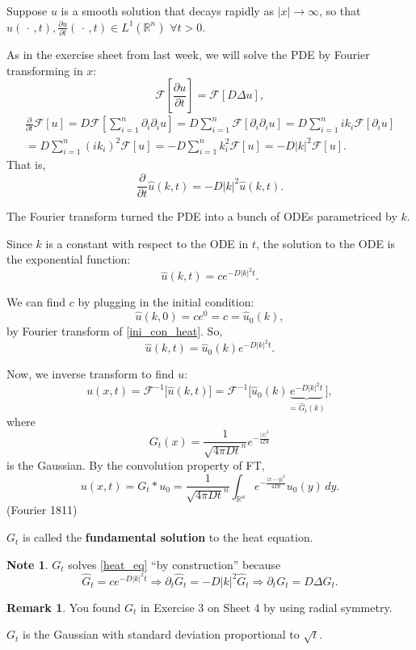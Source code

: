 \documentclass[12pt]{article}
\theoremstyle{definition}
\newtheorem*{remark}{Remark}
\newtheorem*{note}{Note}
\begin{document}
Suppose $u$ is a smooth solution that decays rapidly as $|x|\to\infty$, so that $u(\,\cdot\,,t),\frac{\partial u}{\partial t}(\,\cdot\,,t)\in L^1(\mathbb R^n)$ $\forall t>0$.

As in the exercise sheet from last week, we will solve the PDE by Fourier transforming in $x$:
\[\mathcal F\left[\frac{\partial u}{\partial t}\right]=\mathcal F[D\Delta u],\]
\begin{multline*}
\frac\partial{\partial t}\mathcal F[u]=D\mathcal F\left[\sum_{i=1}^n\partial_i\partial_iu\right]=D\sum_{i=1}^n\mathcal F[\partial_i\partial_iu]=D\sum_{i=1}^nik_i\mathcal F[\partial_iu]\\
=D\sum_{i=1}^n(ik_i)^2\mathcal F[u]=-D\sum_{i=1}^nk_i^2\mathcal F[u]=-D|k|^2\mathcal F[u].
\end{multline*}
That is,
\[\frac\partial{\partial t}\hat u(k,t)=-D|k|^2\hat u(k,t).\]

The Fourier transform turned the PDE into a bunch of ODEs parametriced by $k$.

Since $k$ is a constant with respect to the ODE in $t$, the solution to the ODE is the exponential function:
\[\hat u(k,t)=ce^{-D|k|^2t}.\]

We can find $c$ by plugging in the initial condition:
\[\hat u(k,0)=ce^0=c=\hat u_0(k),\]
by Fourier transform of \eqref{ini_con_heat}. So,
\[\hat u(k,t)=\hat u_0(k)e^{-D|k|^2t}.\]

Now, we inverse transform to find $u$:
\[u(x,t)=\mathcal F^{-1}\big[\hat u(k,t)\big]=\mathcal F^{-1}\big[\hat u_0(k)\underbrace{e^{-D|k|^2t}}_{=\widehat G_t(k)}\big],\]
where
\[G_t(x)=\frac1{\sqrt{4\pi Dt}^n}e^{-\frac{|x|^2}{4Dt}}\]
is the Gaussian. By the convolution property of FT,
\[u(x,t)=G_t*u_0=\frac1{\sqrt{4\pi Dt}^n}\int_{\mathbb R^n}e^{-\frac{|x-y|^2}{4Dt}}u_0(y)\,dy.\]
(Fourier 1811)

$G_t$ is called the \textbf{fundamental solution} to the heat equation.

\begin{note}
$G_t$ solves \eqref{heat_eq} ``by construction'' because
\[\widehat G_t=ce^{-D|k|^2t}\Longrightarrow\partial_t\widehat G_t=-D|k|^2\widehat G_t\Longrightarrow\partial_tG_t=D\Delta G_t.\]
\end{note}

\begin{remark}
You found $G_t$ in Exercise 3 on Sheet 4 by using radial symmetry.
\end{remark}

$G_t$ is the Gaussian with standard deviation proportional to $\sqrt t$.
\end{document}
